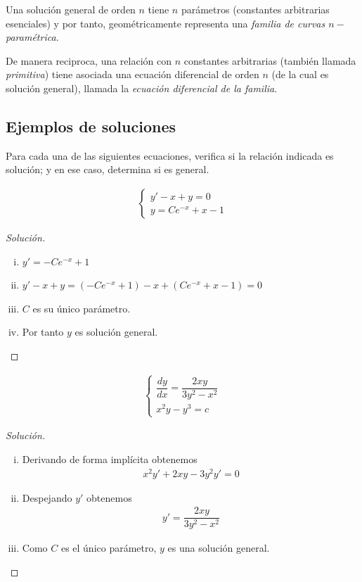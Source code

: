 \begin{definicion}
	Una solución general de orden $ n $ tiene $ n $ parámetros (constantes arbitrarias esenciales) y por tanto, geométricamente representa una \emph{familia de curvas $n-$paramétrica. }

	De manera reciproca, una relación con $ n $ constantes arbitrarias (también llamada \emph{primitiva}) tiene asociada una ecuación diferencial de orden $n$ (de la cual es solución general), llamada la \emph{ecuación diferencial de la familia}.

\end{definicion}

\subsection{Ejemplos de soluciones}


Para cada una de las siguientes ecuaciones, verifica si la relación indicada es solución; y en ese caso, determina si es general.




\begin{align}
	\begin{cases}
		y'-x+y=0\\
		y = Ce^{-x}+x-1
	\end{cases}
\end{align}



\begin{proof}[Solución]
	\begin{enumerate}[(i)]
		\item $y'=-Ce^{-x}+1$
		\item $y'-x+y= (-Ce^{-x}+1)-x+(Ce^{-x}+x-1)=0$
		\item $C$ es su único parámetro.
		\item Por tanto $y$ es solución general.
	\end{enumerate}
\end{proof}



\begin{align}
	\begin{cases}
		\dfrac{dy}{dx}=\dfrac{2xy}{3y^{2}-x^{2}}\\
		x^{2}y-y^{3}=c
	\end{cases}
\end{align}



\begin{proof}[Solución]
	\begin{enumerate}[(i)]
		\item Derivando de forma implícita obtenemos
		\begin{align}
			x^{2}y'+2xy-3y^{2}y'=0
		\end{align}
		\item Despejando $y'$ obtenemos
		\begin{align}
			y'=\dfrac{2xy}{3y^{2}-x^{2}}
		\end{align}
		\item Como $C$ es el único parámetro, $y$ es una solución general.
	\end{enumerate}
\end{proof}



